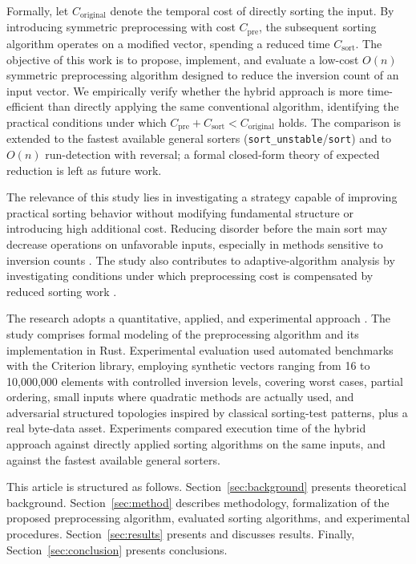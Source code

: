 \documentclass[namedate,webpdf,contemporary,large]{TBench-template}%
\theoremstyle{thmstyleone}%
\theoremstyle{thmstyletwo}%
\theoremstyle{thmstylethree}%
\begin{document}
Formally, let $C_{\text{original}}$ denote the temporal cost of directly sorting the input. By introducing symmetric preprocessing with cost $C_{\text{pre}}$, the subsequent sorting algorithm operates on a modified vector, spending a reduced time $C_{\text{sort}}$. The objective of this work is to propose, implement, and evaluate a low-cost $O(n)$ symmetric preprocessing algorithm designed to reduce the inversion count of an input vector. We empirically verify whether the hybrid approach is more time-efficient than directly applying the same conventional algorithm, identifying the practical conditions under which $C_{\text{pre}} + C_{\text{sort}} < C_{\text{original}}$ holds. The comparison is extended to the fastest available general sorters (\texttt{sort\_unstable}/\texttt{sort}) and to $O(n)$ run-detection with reversal; a formal closed-form theory of expected reduction is left as future work.

The relevance of this study lies in investigating a strategy capable of improving practical sorting behavior without modifying fundamental structure or introducing high additional cost. Reducing disorder before the main sort may decrease operations on unfavorable inputs, especially in methods sensitive to inversion counts \cite{estivill-castro_survey_1992,hwang_presorting_2000}. The study also contributes to adaptive-algorithm analysis by investigating conditions under which preprocessing cost is compensated by reduced sorting work \cite{mannila_measures_1984,hwang_presorting_2000}.

The research adopts a quantitative, applied, and experimental approach \cite{gil_metodos_2019,sampieri_metodologia_2021}. The study comprises formal modeling of the preprocessing algorithm and its implementation in Rust. Experimental evaluation used automated benchmarks with the Criterion library, employing synthetic vectors ranging from 16 to 10,000,000 elements with controlled inversion levels, covering worst cases, partial ordering, small inputs where quadratic methods are actually used, and adversarial structured topologies inspired by classical sorting-test patterns, plus a real byte-data asset. Experiments compared execution time of the hybrid approach against directly applied sorting algorithms on the same inputs, and against the fastest available general sorters.

This article is structured as follows. Section~\ref{sec:background} presents theoretical background. Section~\ref{sec:method} describes methodology, formalization of the proposed preprocessing algorithm, evaluated sorting algorithms, and experimental procedures. Section~\ref{sec:results} presents and discusses results. Finally, Section~\ref{sec:conclusion} presents conclusions.
\end{document}
